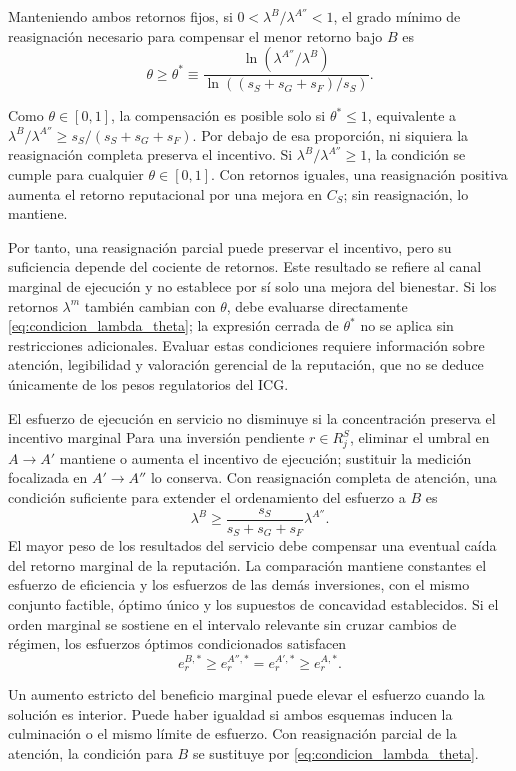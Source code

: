 Manteniendo ambos retornos fijos, si \(0<\lambda^B/\lambda^{A''}<1\), el grado mínimo de reasignación necesario para compensar el menor retorno bajo \(B\) es
\begin{equation}
\label{eq:umbral_theta_reputacion}
\theta\geq\theta^*
\equiv
\frac{\ln(\lambda^{A''}/\lambda^B)}
{\ln((s_S+s_G+s_F)/s_S)}.
\end{equation}

Como \(\theta\in[0,1]\), la compensación es posible solo si \(\theta^*\leq1\), equivalente a \(\lambda^B/\lambda^{A''}\geq s_S/(s_S+s_G+s_F)\). Por debajo de esa proporción, ni siquiera la reasignación completa preserva el incentivo. Si \(\lambda^B/\lambda^{A''}\geq1\), la condición se cumple para cualquier \(\theta\in[0,1]\). Con retornos iguales, una reasignación positiva aumenta el retorno reputacional por una mejora en \(C_S\); sin reasignación, lo mantiene.

Por tanto, una reasignación parcial puede preservar el incentivo, pero su suficiencia depende del cociente de retornos. Este resultado se refiere al canal marginal de ejecución y no establece por sí solo una mejora del bienestar. Si los retornos \(\lambda^m\) también cambian con \(\theta\), debe evaluarse directamente \eqref{eq:condicion_lambda_theta}; la expresión cerrada de \(\theta^*\) no se aplica sin restricciones adicionales. Evaluar estas condiciones requiere información sobre atención, legibilidad y valoración gerencial de la reputación, que no se deduce únicamente de los pesos regulatorios del ICG.

\begin{resultadobox}
{El esfuerzo de ejecución en servicio no disminuye si la concentración preserva el incentivo marginal}
\label{res:incentivo_ejecucion_rs}
Para una inversión pendiente \(r\in R_j^S\), eliminar el umbral en \(A\to A'\) mantiene o aumenta el incentivo de ejecución; sustituir la medición focalizada en \(A'\to A''\) lo conserva. Con reasignación completa de atención, una condición suficiente para extender el ordenamiento del esfuerzo a \(B\) es
\[
\lambda^B\geq\frac{s_S}{s_S+s_G+s_F}\lambda^{A''}.
\]
El mayor peso de los resultados del servicio debe compensar una eventual caída del retorno marginal de la reputación. La comparación mantiene constantes el esfuerzo de eficiencia y los esfuerzos de las demás inversiones, con el mismo conjunto factible, óptimo único y los supuestos de concavidad establecidos. Si el orden marginal se sostiene en el intervalo relevante sin cruzar cambios de régimen, los esfuerzos óptimos condicionados satisfacen
\begin{equation}
e_r^{B,*}\geq e_r^{A'',*}=e_r^{A',*}\geq e_r^{A,*}.
\end{equation}

Un aumento estricto del beneficio marginal puede elevar el esfuerzo cuando la solución es interior. Puede haber igualdad si ambos esquemas inducen la culminación o el mismo límite de esfuerzo. Con reasignación parcial de la atención, la condición para \(B\) se sustituye por \eqref{eq:condicion_lambda_theta}.
\end{resultadobox}

